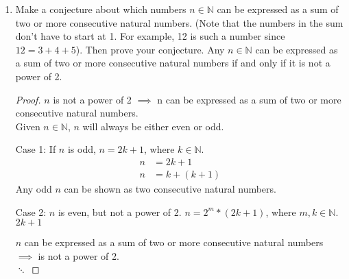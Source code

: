 \documentclass[12pt,a4paper,reqno,parskip=full]{amsart}
\numberwithin{equation}{section}
\theoremstyle{plain}
\theoremstyle{definition}
\begin{document}
\begin{enumerate}
\begin{proof}
          Assume $A$, $B$, $C$, and $D$ are all non-empty have no duplicate elements between them.
          \[|(A\times B)\cup(C\times D)| = |A| * |B| + |C| * |D|\]
          \begin{align*}
            |(A\cup C)\times(B\cup D)| & = (|A| + |C|) * (|B| + |D|)                     \\
                                       & = |A| * |B| + |C| * |D| + |A| * |D| + |B| * |C| \\
          \end{align*}
          \begin{align*}
            |A| * |B| + |C| * |D| & = |A| * |B| + |C| * |D| + |A| * |D| + |B| * |C| \\
            0                     & = |A| * |D| + |B| * |C|
          \end{align*}
          Clearly, the conjecture does not hold in this case.
        \end{proof}
  \item Make a conjecture about which numbers $n\in\mathbb{N}$ can be expressed as a sum of two or
        more consecutive natural numbers. (Note that the numbers in the sum don't have to start at
        1. For example, 12 is such a number since $12=3+4+5$). Then prove your conjecture.
        \conjecture Any $n\in\mathbb{N}$ can be expressed as a sum of two or more consecutive
        natural numbers if and only if it is not a power of 2.
        \begin{proof}
          $n$ is not a power of 2 $\implies$
          n can be expressed as a sum of two or more consecutive natural numbers. \\
          Given $n\in\mathbb{N}$, $n$ will always be either even or odd.

          Case 1: If $n$ is odd, $n=2k+1$, where $k\in\mathbb{N}$.
          \begin{align*}
            n & = 2k + 1      \\
            n & = k + (k + 1)
          \end{align*}
          Any odd $n$ can be shown as two consecutive natural numbers.

          Case 2: $n$ is even, but not a power of 2. $n = 2^m * (2k + 1)$, where $m,k\in\mathbb{N}$.
          $2k + 1$



          $n$ can be expressed as a sum of two or more consecutive natural numbers
          $\implies$ is not a power of 2. \\
          $\ddots$
        \end{proof}
\end{enumerate}
\end{document}
